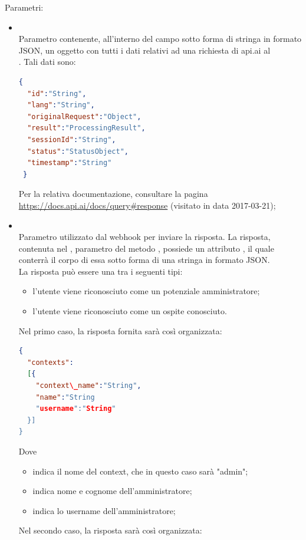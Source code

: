 \begin{itemize}
\begin{itemize}
		Parametri:
		\begin{itemize}
			\item {} \\
			Parametro contenente, all'interno del campo  sotto forma di stringa in formato JSON, un oggetto con tutti i dati relativi ad una richiesta di api.ai al \\ . Tali dati sono:
\begin{lstlisting}[language=json,firstnumber=1]
{
  "id":"String",
  "lang":"String",
  "originalRequest":"Object",
  "result":"ProcessingResult",
  "sessionId":"String",
  "status":"StatusObject",
  "timestamp":"String"
 }
\end{lstlisting}
Per la relativa documentazione, consultare la pagina \url{https://docs.api.ai/docs/query#response} (visitato in data 2017-03-21);
			\item {} \\
			Parametro utilizzato dal webhook per inviare la risposta. La risposta, contenuta nel , parametro del metodo , possiede un attributo , il quale conterrà il corpo di essa sotto forma di una stringa in formato JSON. \\
La risposta può essere una tra i seguenti tipi:
\begin{itemize}
    \item l'utente viene riconosciuto come un potenziale amministratore;
    \item l'utente viene riconosciuto come un ospite conosciuto.
\end{itemize}
Nel primo caso, la risposta fornita sarà così organizzata:
\begin{lstlisting}[language=json,firstnumber=1]
{
  "contexts": 
  [{
    "context\_name":"String",
    "name":"String
    "username":"String"
  }]
}
\end{lstlisting}
Dove
\begin{itemize}
    \item {} indica il nome del context, che in questo caso sarà "admin";
    \item {} indica nome e cognome dell'amministratore;
    \item {} indica lo username dell'amministratore;
\end{itemize}
Nel secondo caso, la risposta sarà così organizzata:
\begin{lstlisting}[language=json,firstnumber=1]

\end{lstlisting}
\end{itemize}
\end{itemize}
\end{itemize}
